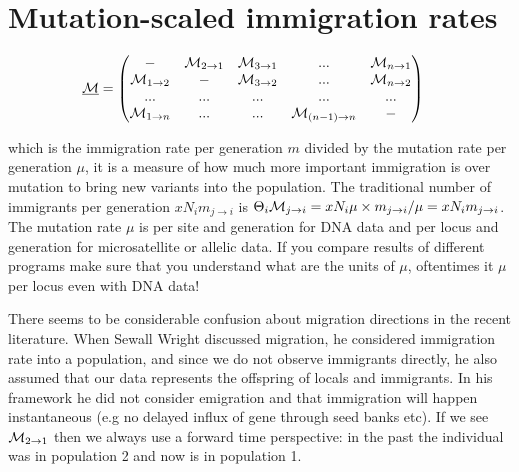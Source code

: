 \section*{Mutation-scaled immigration rates}
\vskip -1cm 
\begin{align}
\underline{\mathcal{M}} &= \left( \begin{matrix} - & \mathcal{M}_{2 \rightarrow 1} & \mathcal{M}_{3 \rightarrow 1} & ... & \mathcal{M}_{n \rightarrow 1} \\  \mathcal{M}_{1 \rightarrow 2} & - & \mathcal{M}_{3 \rightarrow 2} & ... & \mathcal{M}_{n \rightarrow 2}\\ 
... & ... & ... & ... & ... \\
\mathcal{M}_{1 \rightarrow n}  & ... & ... & \mathcal{M}_{(n-1) \rightarrow n}  & - \end{matrix} \right)
\end{align}

which is the immigration rate per generation $m$ divided by the mutation rate per generation $\mu$, it is a measure of how much more important immigration is over mutation to bring new variants into the population. The traditional number of immigrants per generation $xN_im_{j\rightarrow i}$ is  $\Theta_i\mathcal{M}_{j\rightarrow i} = xN_{i}\mu \times m_{j\rightarrow i} / \mu = xN_im_{j\rightarrow i}$. The mutation rate $\mu$ is per site and generation for DNA data and per locus and generation for microsatellite or allelic data. If you compare results of different programs make sure that you understand what are the units of $\mu$, oftentimes it $\mu$ per locus even with DNA data!

There seems to be considerable confusion about migration directions in the recent literature. When Sewall Wright discussed migration, he considered immigration rate into a population, and since we do not observe immigrants directly, he also assumed that our data represents the offspring of locals and immigrants. In his framework he did not consider emigration and  that immigration will happen instantaneous (e.g no delayed influx of gene through seed banks etc). If we see $\mathcal{M}_{2 \rightarrow 1}$ then we always use a forward time perspective: in the past the individual was in population 2 and now is in population 1. 

